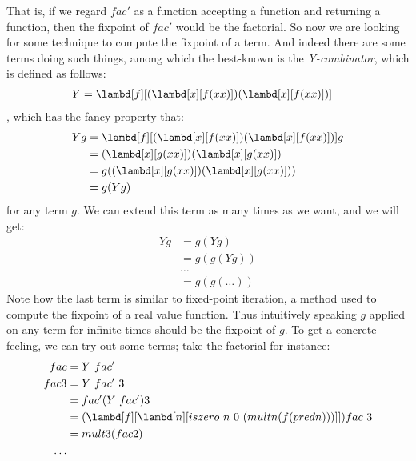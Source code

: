 \documentclass[../../../include/open-logic-section]{subfiles}
\begin{document}
That is, if we regard $fac'$ as a function accepting a function and
returning a function, then the fixpoint of $fac'$ would be the
factorial. So now we are looking for some technique to compute the
fixpoint of a term. And indeed there are some terms doing such things,
among which the best-known is the \emph{Y-combinator}, which is
defined as follows:
\begin{align*}
  Y &=  \lambd[f][(\lambd[x][f (x x)]) (\lambd[x][f (x x)])]
\end{align*}
, which has the fancy property that:
\begin{align*}
  Y g &= \lambd[f][(\lambd[x][f (x x)]) (\lambd[x][f (x x)])] g \\
      &= (\lambd[x][g (x x)]) (\lambd[x][g (x x)]) \\
      &= g ((\lambd[x][g (x x)]) (\lambd[x][g (x x)])) \\
      &= g (Y g)
\end{align*}
for any term $g$. We can extend this term as many times as we want,
and we will get:
\begin{align*}
    Y g &= g (Y g) \\
        &= g (g (Y g)) \\
        &\ldots \\
        &= g (g (\ldots ))
\end{align*}
Note how the last term is similar to fixed-point iteration, a method used to
compute the fixpoint of a real value function. Thus intuitively
speaking $g$ applied on any term for infinite times should be the
fixpoint of $g$. To get a concrete feeling, we can try out some terms;
take the factorial for instance:
\begin{align*}
  fac &= Y ~ fac'\\
  fac 3 &= Y ~ fac' ~ 3 \\
      &=fac' (Y ~ fac') 3 \\
      &=(\lambd[f][\lambd[n][iszero ~ n ~ 0 ~ (mult n (f (pred n)))]])
  fac ~ 3\\
      &= mult 3 (fac 2) \\
      \ldots
\end{align*}
\end{document}
